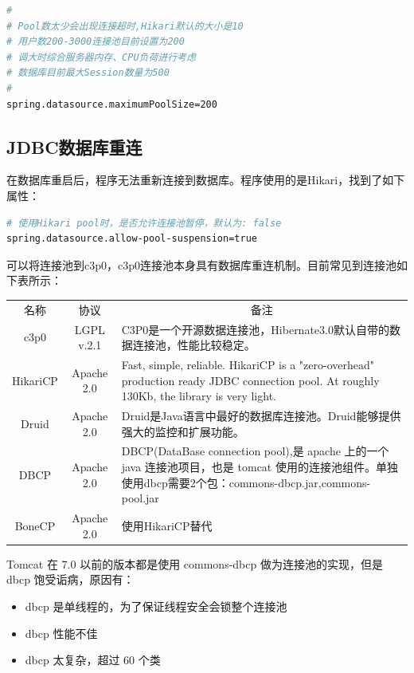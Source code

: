 \documentclass[letter]{book}
\begin{document}
\begin{lstlisting}[language=Bash]
#
# Pool数太少会出现连接超时,Hikari默认的大小是10
# 用户数200-3000连接池目前设置为200
# 调大时综合服务器内存、CPU负荷进行考虑
# 数据库目前最大Session数量为500
#
spring.datasource.maximumPoolSize=200
\end{lstlisting}


\subsection*{JDBC数据库重连}

在数据库重启后，程序无法重新连接到数据库。程序使用的是Hikari，找到了如下属性：

\begin{lstlisting}[language=Bash]
# 使用Hikari pool时，是否允许连接池暂停，默认为: false
spring.datasource.allow-pool-suspension=true
\end{lstlisting}

可以将连接池到c3p0，c3p0连接池本身具有数据库重连机制。目前常见到连接池如下表所示：

\begin{tabular}{|c|c|p{7cm}|}
	\hline
	\multirow{1}{*}{名称}
	& \multicolumn{1}{c|}{协议} 
	& \multicolumn{1}{c|}{备注}\\			
	\cline{1-3}
	c3p0 &  LGPL v.2.1  & C3P0是一个开源数据连接池，Hibernate3.0默认自带的数据连接池，性能比较稳定。\\
	\hline
	HikariCP & Apache 2.0 & Fast, simple, reliable. HikariCP is a "zero-overhead" production ready JDBC connection pool. At roughly 130Kb, the library is very light. \\
	\hline
	Druid & Apache 2.0 & Druid是Java语言中最好的数据库连接池。Druid能够提供强大的监控和扩展功能。 \\
	\hline
	DBCP & Apache 2.0 & DBCP(DataBase connection pool),是 apache 上的一个 java 连接池项目，也是 tomcat 使用的连接池组件。单独使用dbcp需要2个包：commons-dbcp.jar,commons-pool.jar \\
	\hline
	BoneCP & Apache 2.0 & 使用HikariCP替代\\
	\hline
\end{tabular}

Tomcat 在 7.0 以前的版本都是使用 commons-dbcp 做为连接池的实现，但是 dbcp 饱受诟病，原因有：

\begin{itemize}
	\item{dbcp 是单线程的，为了保证线程安全会锁整个连接池}
	\item{dbcp 性能不佳}
	\item{dbcp 太复杂，超过 60 个类}
\end{itemize}
\end{document}
